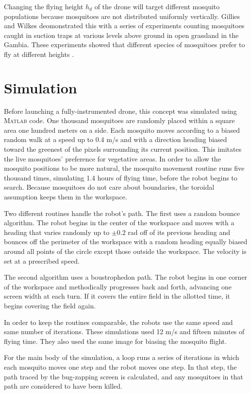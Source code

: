 \documentclass[letterpaper, 10 pt, conference]{ieeeconf}  %
\begin{document}
Changing the flying height $h_d$ of the drone will target different mosquito populations   because mosquitoes are not distributed uniformly vertically.  Gillies and Wilkes deomonstrated this with a series of experiments counting mosquitoes caught in suction traps at various levels above ground in open grassland in the Gambia.  These experiments showed that different species of mosquitoes prefer to fly at different heights \cite{gillies1976vertical}.
  
  
    \section{Simulation}
    
   Before launching a fully-instrumented drone, this concept was simulated using \textsc{Matlab} code.  One thousand mosquitoes are randomly placed within a square area one hundred meters on a side.  Each mosquito moves according to a biased random walk at a speed up to 0.4 m/s and with a direction heading biased toward the greenest of the pixels surrounding its current position.  This imitates the live mosquitoes' preference for vegetative areas.  In order to allow the mosquito positions to be more natural, the mosquito movement routine runs five thousand times, simulating 1.4 hours of flying time, before the robot begins to search.  Because mosquitoes do not care about boundaries, the toroidal assumption keeps them in the workspace.
    
Two different routines handle the robot's path.  The first uses a random bounce algorithm.  The robot begins in the center of the workspace and moves with a heading that varies randomly up to $\pm$0.2 rad off of its previous heading and bounces off the perimeter of the workspace with a random heading equally biased around all points of the circle except those outside the workspace.  The velocity is set at a prescribed speed.

The second algorithm uses a boustrophedon path.  The robot begins in one corner of the workspace and methodically progresses back and forth, advancing one screen width at each turn.  If it covers the entire field in the allotted time, it begins covering the field again.

In order to keep the routines comparable, the robots use the same speed and same number of iterations.  These simulations used 12 m/s and fifteen minutes of flying time.  They also used the same image for biasing the mosquito flight.

For the main body of the simulation, a loop runs a series of iterations in which each mosquito moves one step and the robot moves one step.  In that step, the path traced by the bug-zapping screen is calculated, and any mosquitoes in that path are considered to have been killed.
\end{document}
